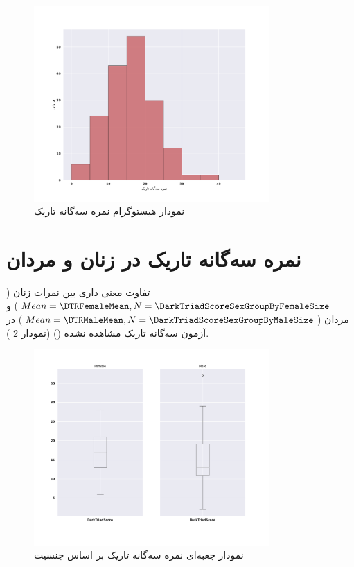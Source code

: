 \begin{figure}[htpb]
    \centering
    \includegraphics[width=0.8\textwidth]{./img/DTRHistogram.pdf}
    \caption{نمودار هیستوگرام نمره  سه‌گانه تاریک}
    \label{fig:DTRHistogram}
\end{figure}

\section{نمره سه‌گانه تاریک در زنان و مردان}
تفاوت معنی داری بین نمرات زنان
($Mean=\DTRFemaleMean,N=\DarkTriadScoreSexGroupByFemaleSize$)
و مردان
($Mean=\DTRMaleMean,N=\DarkTriadScoreSexGroupByMaleSize$)
در آزمون سه‌گانه تاریک مشاهده نشده
\!(\DarkTriadScoreSexIndTTestPValue)
\!(نمودار
\ref{fig:BoxPlotDarkTriadScoreSex}
).

\begin{figure}[htpb]
    \centering
    \includegraphics[width=0.8\textwidth]{./img/BoxPlotDarkTriadScoreSex.png}
    \caption{نمودار جعبه‌ای نمره سه‌گانه تاریک بر اساس جنسیت}
    \label{fig:BoxPlotDarkTriadScoreSex}
\end{figure}

